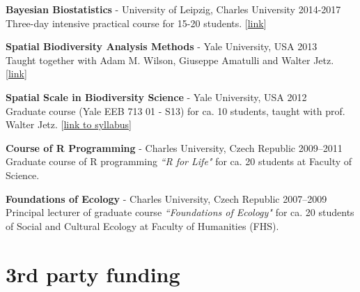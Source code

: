 \begin{innerlist}


\item[]{\bf Bayesian Biostatistics} - University of Leipzig, Charles University
\hfill {2014-2017}\\
Three-day intensive practical course for 15-20 students.
[\href{http://www.petrkeil.com/?p=1881}{link}]

\medskip

\item[]{\bf Spatial Biodiversity Analysis Methods} - Yale University, USA
\hfill {2013}\\
Taught together with Adam M. Wilson, Giuseppe Amatulli and Walter Jetz.
[\href{https://sites.google.com/site/spatialbiodiversity/home}{link}]

\medskip

\item[]{\bf Spatial Scale in Biodiversity Science} - Yale University, USA
\hfill {2012} \\
Graduate course (Yale EEB 713 01 - S13) for ca. 10 students, taught with prof. Walter Jetz. [\href{http://pantheon.yale.edu/~pk327/pdf/Keil&Jetz_syllabus.pdf}{link to syllabus}]

\medskip

\item[]{\bf Course of R Programming} - Charles University, Czech Republic
\hfill {2009--2011} \\
Graduate course of R programming \textit{``R for Life"} for ca. 20 students at Faculty of Science.

\medskip

\item[]{\bf Foundations of Ecology} - Charles University, Czech Republic
\hfill {2007--2009} \\
Principal lecturer of graduate course \textit{``Foundations of Ecology"} for ca. 20 students of Social and Cultural Ecology at Faculty of Humanities (FHS).

\end{innerlist}

\HRule


\section{3rd party funding}

